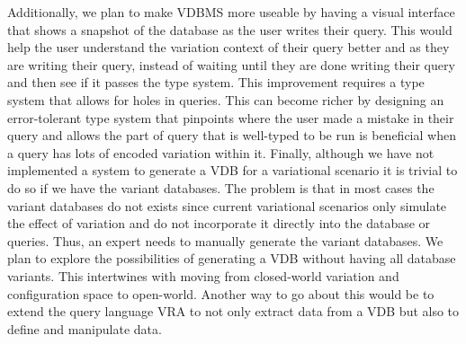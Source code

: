 %
Additionally, we plan to make VDBMS more useable by having a visual 
interface that shows a snapshot of the database as the user writes their
query. This would help the user understand the variation context of their 
query better and as they are writing their query, instead of waiting until 
they are done writing their query and then see if it passes the type system.
%
This improvement requires a type system that allows for holes in queries.
This can become richer by 
designing an error-tolerant type system that pinpoints
where the user made a mistake in their query and allows the part of
query that is well-typed to be run is beneficial when a query has lots of 
encoded variation within it. 
%
Finally, although we have not implemented a system to generate a VDB for 
a variational scenario it is trivial to do so if we have the variant databases.
The problem is that in most cases the variant databases do not exists
since current variational scenarios only simulate the effect of variation
and do not incorporate it directly into the database or queries.
Thus, an expert needs to manually generate the variant databases.
%
We plan to explore the possibilities of generating a VDB without 
having all database variants. This intertwines with moving from closed-world
variation and configuration space to open-world. 
%
Another way to go about this would be to extend the query language VRA 
to not only extract data from a VDB but also to define and manipulate data. 


%
%
%
%
%
%

